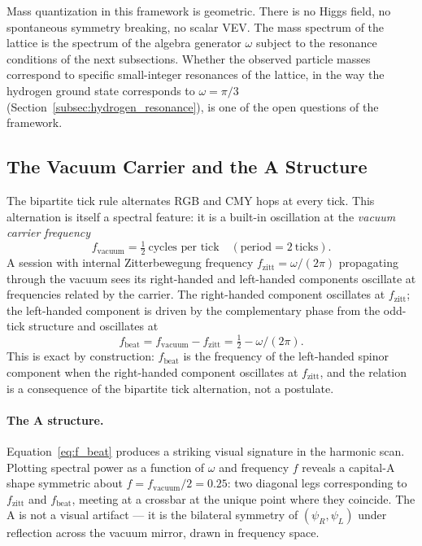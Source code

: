 Mass quantization in this framework is geometric. There is no Higgs
field, no spontaneous symmetry breaking, no scalar VEV. The mass
spectrum of the lattice is the spectrum of the algebra generator
$\omega$ subject to the resonance conditions of the next subsections.
Whether the observed particle masses correspond to specific small-integer
resonances of the lattice, in the way the hydrogen ground state
corresponds to $\omega = \pi/3$ (Section~\ref{subsec:hydrogen_resonance}),
is one of the open questions of the framework.

\subsection{The Vacuum Carrier and the A Structure}
\label{subsec:vacuum_carrier}

The bipartite tick rule alternates RGB and CMY hops at every tick.
This alternation is itself a spectral feature: it is a built-in
oscillation at the \emph{vacuum carrier frequency}
\begin{equation}
    f_\text{vacuum} = \tfrac{1}{2}\ \text{cycles per tick}
        \quad (\text{period} = 2\ \text{ticks}).
    \label{eq:vacuum_carrier}
\end{equation}
A session with internal Zitterbewegung frequency
$f_\text{zitt} = \omega/(2\pi)$ propagating through the vacuum sees
its right-handed and left-handed components oscillate at frequencies
related by the carrier. The right-handed component oscillates at
$f_\text{zitt}$; the left-handed component is driven by the
complementary phase from the odd-tick structure and oscillates at
\begin{equation}
    f_\text{beat} = f_\text{vacuum} - f_\text{zitt}
                  = \tfrac{1}{2} - \omega/(2\pi).
    \label{eq:f_beat}
\end{equation}
This is exact by construction: $f_\text{beat}$ is the frequency of
the left-handed spinor component when the right-handed component
oscillates at $f_\text{zitt}$, and the relation is a consequence of
the bipartite tick alternation, not a postulate.

\paragraph{The A structure.}
Equation~\eqref{eq:f_beat} produces a striking visual signature in
the harmonic scan. Plotting spectral power as a function of
$\omega$ and frequency $f$ reveals a capital-A shape symmetric about
$f = f_\text{vacuum}/2 = 0.25$: two diagonal legs corresponding to
$f_\text{zitt}$ and $f_\text{beat}$, meeting at a crossbar at the
unique point where they coincide. The A is not a visual artifact ---
it is the bilateral symmetry of $(\psi_R, \psi_L)$ under reflection
across the vacuum mirror, drawn in frequency space.

